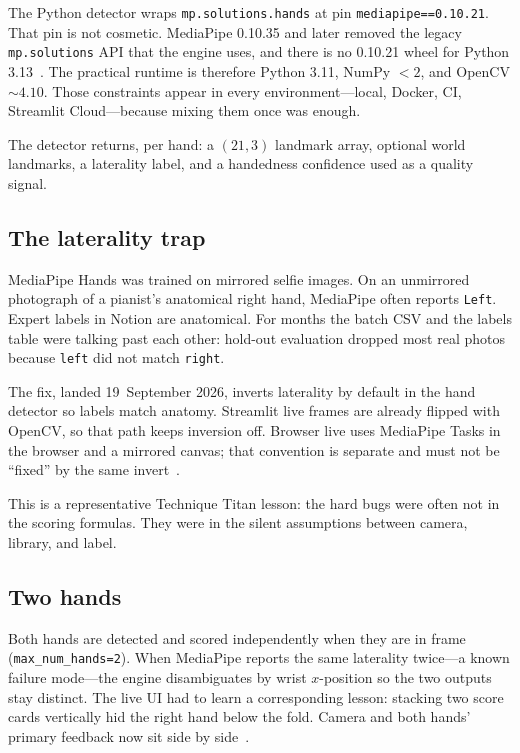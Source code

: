 \documentclass[11pt,a4paper]{article}
\newcommand{\code}[1]{\texttt{#1}}
\begin{document}
The Python detector wraps \code{mp.solutions.hands} at pin \code{mediapipe==0.10.21}.
That pin is not cosmetic.
MediaPipe 0.10.35 and later removed the legacy \code{mp.solutions} API that the engine uses, and there is no 0.10.21 wheel for Python 3.13~\cite{errors}.
The practical runtime is therefore Python 3.11, NumPy \(<2\), and OpenCV \(\sim 4.10\).
Those constraints appear in every environment---local, Docker, CI, Streamlit Cloud---because mixing them once was enough.

The detector returns, per hand: a \((21,3)\) landmark array, optional world landmarks, a laterality label, and a handedness confidence used as a quality signal.

\subsection{The laterality trap}

MediaPipe Hands was trained on mirrored selfie images.
On an unmirrored photograph of a pianist's anatomical right hand, MediaPipe often reports \texttt{Left}.
Expert labels in Notion are anatomical.
For months the batch CSV and the labels table were talking past each other: hold-out evaluation dropped most real photos because \texttt{left} did not match \texttt{right}.

The fix, landed 19~September 2026, inverts laterality by default in the hand detector so labels match anatomy.
Streamlit live frames are already flipped with OpenCV, so that path keeps inversion off.
Browser live uses MediaPipe Tasks in the browser and a mirrored canvas; that convention is separate and must not be \enquote{fixed} by the same invert~\cite{errors}.

This is a representative Technique Titan lesson: the hard bugs were often not in the scoring formulas.
They were in the silent assumptions between camera, library, and label.

\subsection{Two hands}

Both hands are detected and scored independently when they are in frame (\code{max\_num\_hands=2}).
When MediaPipe reports the same laterality twice---a known failure mode---the engine disambiguates by wrist \(x\)-position so the two outputs stay distinct.
The live UI had to learn a corresponding lesson: stacking two score cards vertically hid the right hand below the fold.
Camera and both hands' primary feedback now sit side by side~\cite{errors}.
\end{document}
